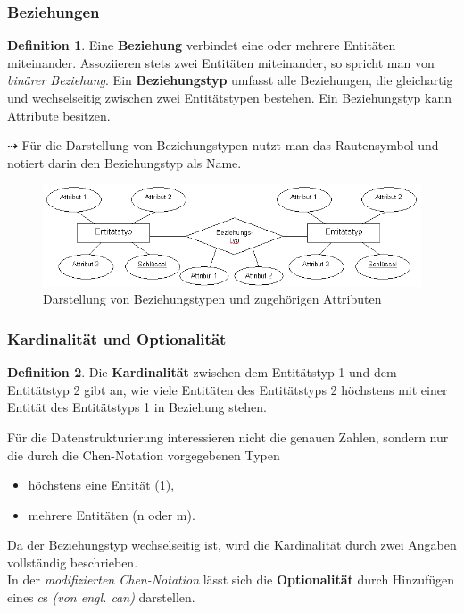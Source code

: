 \documentclass[a4paper,10pt,DIV9, BCOR12mm, oneside,openright,openbib]{scrreprt}
\theoremstyle{definition}
\newtheorem{mydef}{Definition}[section]
\theoremstyle{plain}
\begin{document}
 \subsubsection{Beziehungen}
 \begin{mydef}
  Eine \textbf{Beziehung} verbindet eine oder mehrere Entitäten miteinander. Assoziieren stets zwei Entitäten miteinander, so spricht man von \textit{binärer Beziehung}.  Ein \textbf{Beziehungstyp} umfasst alle Beziehungen, die gleichartig und wechselseitig zwischen zwei Entitätstypen bestehen. Ein Beziehungstyp kann Attribute besitzen. 
 \end{mydef}
$\dashrightarrow$ Für die Darstellung von Beziehungstypen nutzt man das Rautensymbol und notiert darin den Beziehungstyp als Name.
\begin{figure}[h]
 \centering
 \includegraphics[width=1\textwidth]{./Bilder/beziehungen.png}
 \caption{Darstellung von Beziehungstypen und zugehörigen Attributen}
 \label{fig:beziehungen}
\end{figure}

 \subsubsection{Kardinalität und Optionalität}
 \begin{mydef}
  Die \textbf{Kardinalität} zwischen dem Entitätstyp 1 und dem Entitätstyp 2 gibt an, wie viele Entitäten des Entitätstyps 2 höchstens mit einer Entität des Entitätstyps 1 in Beziehung stehen.
 \end{mydef}
 Für die Datenstrukturierung interessieren nicht die genauen Zahlen, sondern nur die durch die Chen-Notation vorgegebenen Typen
 \begin{itemize}
  \item höchstens eine Entität (1),
  \item mehrere Entitäten (n oder m).
 \end{itemize}
 Da der Beziehungstyp wechselseitig ist, wird die Kardinalität durch zwei Angaben vollständig beschrieben.\\
 In der \textit{modifizierten Chen-Notation} lässt sich die \textbf{Optionalität} durch Hinzufügen eines $c$s \textit{(von engl. can)} darstellen.
\end{document}
